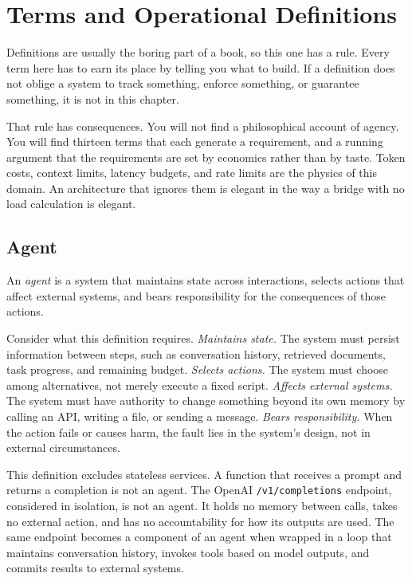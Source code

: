 \chapter{Terms and Operational Definitions}
\label{ch:terms}

Definitions are usually the boring part of a book, so this one has a rule. Every term here has to earn its place by telling you what to build. If a definition does not oblige a system to track something, enforce something, or guarantee something, it is not in this chapter.

That rule has consequences. You will not find a philosophical account of agency. You will find thirteen terms that each generate a requirement, and a running argument that the requirements are set by economics rather than by taste. Token costs, context limits, latency budgets, and rate limits are the physics of this domain. An architecture that ignores them is elegant in the way a bridge with no load calculation is elegant.

\section{Agent}

An \emph{agent} is a system that maintains state across interactions, selects actions that affect external systems, and bears responsibility for the consequences of those actions.

Consider what this definition requires. \textit{Maintains state.} The system must persist information between steps, such as conversation history, retrieved documents, task progress, and remaining budget. \textit{Selects actions.} The system must choose among alternatives, not merely execute a fixed script. \textit{Affects external systems.} The system must have authority to change something beyond its own memory by calling an API, writing a file, or sending a message. \textit{Bears responsibility.} When the action fails or causes harm, the fault lies in the system's design, not in external circumstances.

This definition excludes stateless services. A function that receives a prompt and returns a completion is not an agent. The OpenAI \texttt{/v1/completions} endpoint, considered in isolation, is not an agent. It holds no memory between calls, takes no external action, and has no accountability for how its outputs are used. The same endpoint becomes a component of an agent when wrapped in a loop that maintains conversation history, invokes tools based on model outputs, and commits results to external systems.

